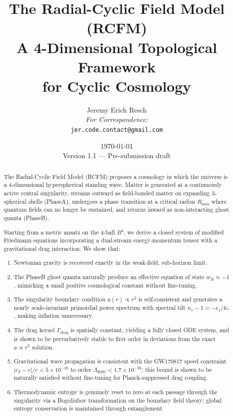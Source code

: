 \documentclass[10pt,twocolumn]{article}
\title{%
  \textbf{The Radial-Cyclic Field Model (RCFM)}\\[6pt]
  \large A 4-Dimensional Topological Framework\\
  for Cyclic Cosmology
}
\author{%
  Jeremy Erich Resch\\[4pt]
  \small \textit{For Correspondence:}\\
  \small \texttt{jer.code.contact@gmail.com}
}
\date{\today \\ \small Version 1.1 --- Pre-submission draft}
\theoremstyle{definition}
\newcommand{\Rmax}{R_{\max}}
\newcommand{\Gammadrag}{\Gamma_{\mathrm{drag}}}
\begin{document}
\maketitle


\begin{abstract}
The Radial-Cyclic Field Model (RCFM) proposes a cosmology in
which the universe is a 4-dimensional hyperspherical standing
wave.  Matter is generated at a continuously active central
singularity, streams outward as field-bonded matter on
expanding 3-spherical shells (Phase\nobreakspace{}A), undergoes a phase
transition at a critical radius \( \Rmax \) where quantum fields
can no longer be sustained, and returns inward as
non-interacting ghost quanta (Phase\nobreakspace{}B).

Starting from a metric ansatz on the 4-ball \( B^{4} \), we
derive a closed system of modified Friedmann equations
incorporating a dual-stream energy-momentum tensor with a
gravitational drag interaction.  We show that:
\begin{enumerate}[label=(\roman*)]
  \item Newtonian gravity is recovered exactly in the
    weak-field, sub-horizon limit.
  \item The Phase\nobreakspace{}B ghost quanta naturally produce an
    effective equation of state \( w_{B}\approx-1 \), mimicking
    a small positive cosmological constant without
    fine-tuning.
  \item The singularity boundary condition \( a(r)\propto r^{2} \)
    is self-consistent and generates a nearly scale-invariant
    primordial power spectrum with spectral tilt
    \( n_{s}-1=-\epsilon_{1}/k_{*} \), making inflation
    unnecessary.
  \item The drag kernel \( \Gammadrag \) is spatially constant,
    yielding a fully closed ODE system, and is shown to be
    perturbatively stable to first order in deviations from
    the exact \( a\propto r^{2} \) solution.
  \item Gravitational wave propagation is consistent with
    the GW170817 speed constraint
    \( |c_{T}-c|/c<5\times10^{-16} \) to order
    \( \Lambda_{\mathrm{RSD}}<1.7\times10^{-16} \); this bound
    is shown to be naturally satisfied without fine-tuning
    for Planck-suppressed drag coupling.
  \item Thermodynamic entropy is genuinely reset to zero at
    each passage through the singularity via a Bogoliubov
    transformation on the boundary field theory; global
    entropy conservation is maintained through entanglement

\end{enumerate}
\end{abstract}
\end{document}
